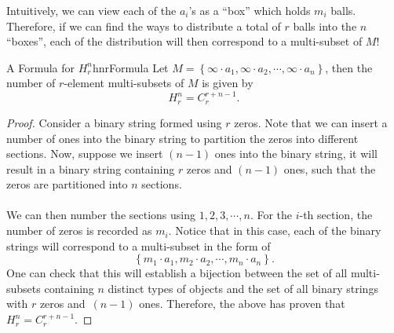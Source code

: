 \documentclass[math]{amznotes}
\theoremstyle{remark}
\begin{document}
Intuitively, we can view each of the $a_i$'s as a ``box'' which holds $m_i$ balls. Therefore, if we can find the ways to distribute a total of $r$ balls into the $n$ ``boxes'', each of the distribution will then correspond to a multi-subset of $M$!
\begin{probox}{A Formula for $H^n_r$}{hnrFormula}
    Let $M = \left\{\infty \cdot a_1, \infty \cdot a_2, \cdots, \infty \cdot a_n\right\}$, then the number of $r$-element multi-subsets of $M$ is given by
    \begin{equation*}
        H^n_r = C^{r + n - 1}_r.
    \end{equation*}
    \tcblower
    \begin{proof}
        Consider a binary string formed using $r$ zeros. Note that we can insert a number of ones into the binary string to partition the zeros into different sections. Now, suppose we insert $(n - 1)$ ones into the binary string, it will result in a binary string containing $r$ zeros and $(n - 1)$ ones, such that the zeros are partitioned into $n$ sections.
        \\\\
        We can then number the sections using $1, 2, 3, \cdots, n$. For the $i$-th section, the number of zeros is recorded as $m_i$. Notice that in this case, each of the binary strings will correspond to a multi-subset in the form of 
        \begin{displaymath}
            \left\{m_1 \cdot a_1, m_2 \cdot a_2, \cdots, m_n \cdot a_n\right\}.
        \end{displaymath}
        One can check that this will establish a bijection between the set of all multi-subsets containing $n$ distinct types of objects and the set of all binary strings with $r$ zeros and~$(n - 1)$ ones. Therefore, the above has proven that $H^n_r = C^{r + n - 1}_r$.
    \end{proof}
\end{probox}
\end{document}
